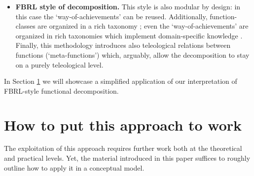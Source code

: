 \documentclass[
]{ceurart}
\begin{document}
\begin{itemize}
  \item \textbf{FBRL style of decomposition.} This style is also modular by design: in this case the `way-of-achievements' can be reused. Additionally, function-classes are organized in a rich taxonomy%
  ; even the `way-of-achievements' are organized in rich taxonomies which implement domain-specific knowledge \cite{kitamuraOntologybasedDescriptionFunctional2003}. Finally, this methodology introduces also teleological relations between functions (`meta-functions') which, arguably, allow the decomposition to stay on a purely teleological level. 
\end{itemize}
In Section \ref{sec:use-case} we will showcase a simplified application of our interpretation of FBRL-style functional decomposition.


\section{How to put this approach to work}\label{sec:use-case}

The exploitation of this approach requires further work both at the theoretical and practical levels. Yet, the material introduced in this paper suffices to roughly outline how to apply it in a conceptual model.
\end{document}
